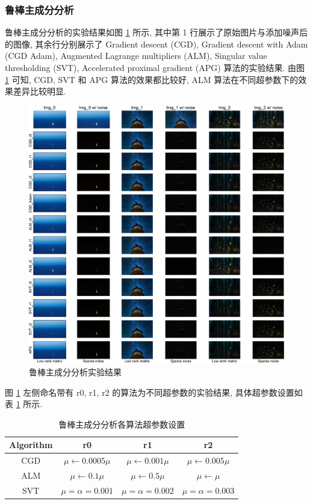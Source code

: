 \documentclass[12pt]{article}
\begin{document}
\subsubsection{鲁棒主成分分析}

鲁棒主成分分析的实验结果如图 \ref{fig:results_rpca} 所示, 其中第 1 行展示了原始图片与添加噪声后的图像, 其余行分别展示了 Gradient descent (CGD), Gradient descent with Adam (CGD Adam), Augmented Lagrange multipliers (ALM), Singular value thresholding (SVT), Accelerated proximal gradient (APG) 算法的实验结果. 由图 \ref{fig:results_rpca} 可知, CGD, SVT 和 APG 算法的效果都比较好, ALM 算法在不同超参数下的效果差异比较明显.

\begin{figure}[!htbp]
  \centering
  \includegraphics[width=17cm]{robust_pca_total.pdf}
  \caption{鲁棒主成分分析实验结果}
  \label{fig:results_rpca}
\end{figure}

图 \ref{fig:results_rpca} 左侧命名带有 \textsf{r0}, \textsf{r1}, \textsf{r2} 的算法为不同超参数的实验结果, 具体超参数设置如表 \ref{tab:rpca_hyperparams} 所示.

\begin{table}[!htbp]
  \centering
  \small
  \caption{鲁棒主成分分析各算法超参数设置}
  \label{tab:rpca_hyperparams}
  \begin{tabular}{cccc}
    \toprule
    Algorithm  & \textsf{r0}  & \textsf{r1} & \textsf{r2}  \\
    \midrule
    CGD & $\mu\leftarrow0.0005\mu$ & $\mu\leftarrow0.001\mu$ & $\mu\leftarrow0.005\mu$ \\
    ALM & $\mu\leftarrow0.1\mu$ & $\mu\leftarrow0.5\mu$ & $\mu\leftarrow\mu$ \\
    SVT & $\mu=\alpha=0.001$ & $\mu=\alpha=0.002$ & $\mu=\alpha=0.003$ \\
    \bottomrule
  \end{tabular}
\end{table}
\end{document}
